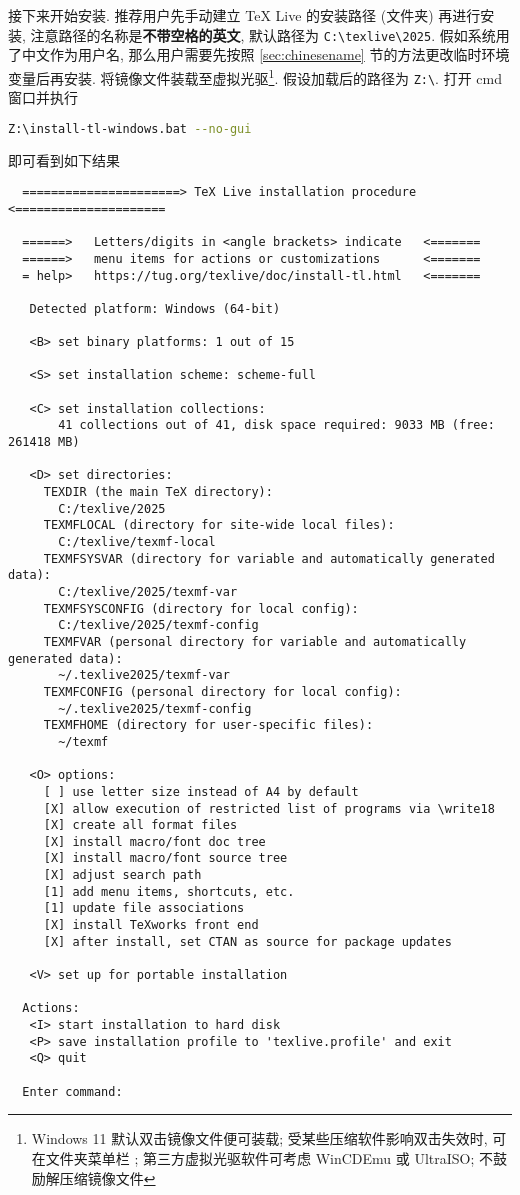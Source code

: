 接下来开始安装.
推荐用户先手动建立 \TeX{} Live 的安装路径 (文件夹) 再进行安装,
注意路径的名称是\textbf{不带空格的英文},
默认路径为 \texttt{C:\textbackslash texlive\textbackslash 2025}.
假如系统用了中文作为用户名,
那么用户需要先按照 \ref{sec:chinesename} 节的方法更改临时环境变量后再安装.
将镜像文件装载至虚拟光驱\footnote{Windows 11 默认双击镜像文件便可装载;
受某些压缩软件影响双击失效时,
可在文件夹菜单栏
;
第三方虚拟光驱软件可考虑 WinCDEmu 或 UltraISO;
不鼓励解压缩镜像文件}.
假设加载后的路径为 \texttt{Z:\textbackslash}.
打开 \textsf{cmd} 窗口并执行
\begin{lstlisting}[language = bash]
  Z:\install-tl-windows.bat --no-gui
\end{lstlisting}
即可看到如下结果
\begin{lstlisting}
  ======================> TeX Live installation procedure <=====================

  ======>   Letters/digits in <angle brackets> indicate   <=======
  ======>   menu items for actions or customizations      <=======
  = help>   https://tug.org/texlive/doc/install-tl.html   <=======

   Detected platform: Windows (64-bit)

   <B> set binary platforms: 1 out of 15

   <S> set installation scheme: scheme-full

   <C> set installation collections:
       41 collections out of 41, disk space required: 9033 MB (free: 261418 MB)

   <D> set directories:
     TEXDIR (the main TeX directory):
       C:/texlive/2025
     TEXMFLOCAL (directory for site-wide local files):
       C:/texlive/texmf-local
     TEXMFSYSVAR (directory for variable and automatically generated data):
       C:/texlive/2025/texmf-var
     TEXMFSYSCONFIG (directory for local config):
       C:/texlive/2025/texmf-config
     TEXMFVAR (personal directory for variable and automatically generated data):
       ~/.texlive2025/texmf-var
     TEXMFCONFIG (personal directory for local config):
       ~/.texlive2025/texmf-config
     TEXMFHOME (directory for user-specific files):
       ~/texmf

   <O> options:
     [ ] use letter size instead of A4 by default
     [X] allow execution of restricted list of programs via \write18
     [X] create all format files
     [X] install macro/font doc tree
     [X] install macro/font source tree
     [X] adjust search path
     [1] add menu items, shortcuts, etc.
     [1] update file associations
     [X] install TeXworks front end
     [X] after install, set CTAN as source for package updates

   <V> set up for portable installation

  Actions:
   <I> start installation to hard disk
   <P> save installation profile to 'texlive.profile' and exit
   <Q> quit

  Enter command:
\end{lstlisting}
